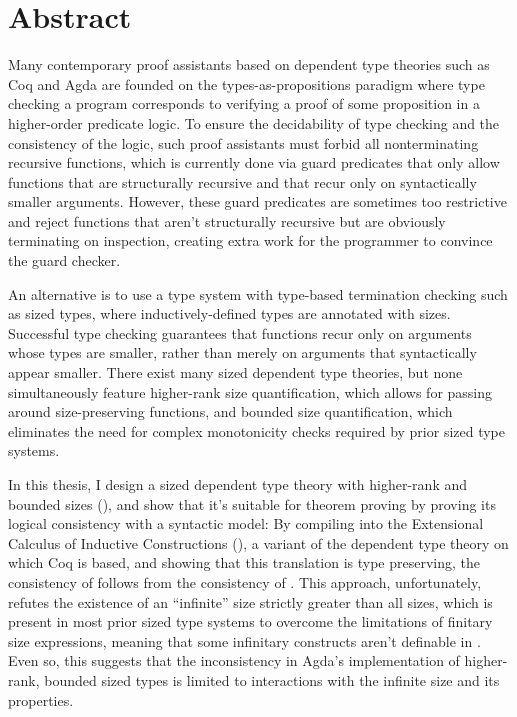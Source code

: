 \chapter{Abstract}

Many contemporary proof assistants based on dependent type theories such as Coq and Agda
are founded on the types-as-propositions paradigm where type checking a program
corresponds to verifying a proof of some proposition in a higher-order predicate logic.
To ensure the decidability of type checking and the consistency of the logic,
such proof assistants must forbid all nonterminating recursive functions,
which is currently done via guard predicates that only allow functions
that are structurally recursive and that recur only on syntactically smaller arguments.
However, these guard predicates are sometimes too restrictive and reject functions
that aren't structurally recursive but are obviously terminating on inspection,
creating extra work for the programmer to convince the guard checker.

An alternative is to use a type system with type-based termination checking such as sized types,
where inductively-defined types are annotated with sizes.
Successful type checking guarantees that functions recur only on arguments whose types are smaller,
rather than merely on arguments that syntactically appear smaller.
There exist many sized dependent type theories,
but none simultaneously feature higher-rank size quantification,
which allows for passing around size-preserving functions,
and bounded size quantification,
which eliminates the need for complex monotonicity checks required by prior sized type systems.

In this thesis, I design a sized dependent type theory with higher-rank and bounded sizes (\lang),
and show that it's suitable for theorem proving by proving its logical consistency with a syntactic model:
By compiling \lang into the Extensional Calculus of Inductive Constructions (\CICE),
a variant of the dependent type theory on which Coq is based,
and showing that this translation is type preserving,
the consistency of \lang follows from the consistency of \CICE.
This approach, unfortunately, refutes the existence of an ``infinite'' size strictly greater than all sizes,
which is present in most prior sized type systems to overcome the limitations of finitary size expressions,
meaning that some infinitary constructs aren't definable in \lang.
Even so, this suggests that the inconsistency in Agda's implementation of higher-rank,
bounded sized types is limited to interactions with the infinite size and its properties.